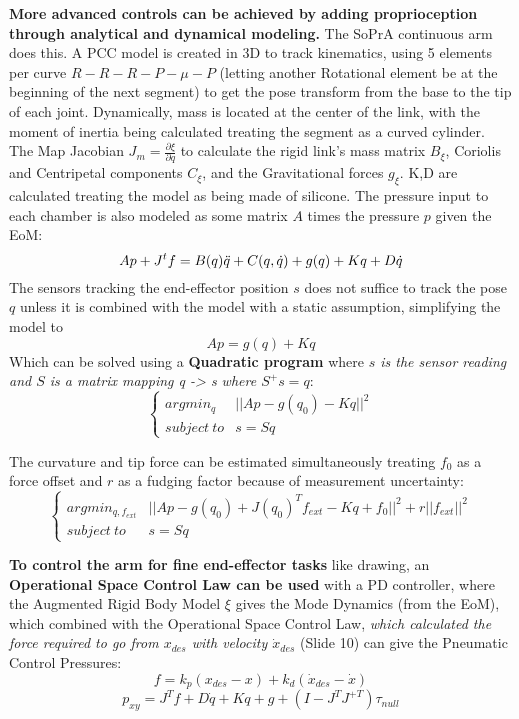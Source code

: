 \documentclass[onecolumn,a4paper]{article}
\begin{document}
\textbf{More advanced controls can be achieved by adding proprioception through analytical and dynamical modeling.} The SoPrA continuous arm does this. A PCC model is created in 3D to track kinematics, using 5 elements per curve $R-R-R-P-\mu-P$ (letting another Rotational element be at the beginning of the next segment) to get the pose transform from the base to the tip of each joint. Dynamically, mass is located at the center of the link, with the moment of inertia being calculated treating the segment as a curved cylinder. The Map Jacobian $J_m=\frac{\partial\xi}{\partial q}$ to calculate the rigid link's mass matrix $B_\xi$, Coriolis and Centripetal components $C_\xi$, and the Gravitational forces $g_\xi$. K,D are calculated treating the model as being made of silicone. The pressure input to each chamber is also modeled as some matrix $A$ times the pressure $p$ given the EoM:
\begin{equation}
    Ap+J^tf=B(q)\Ddot{q}+C(q,\Dot{q})+g(q)+Kq+D\Dot{q}
\end{equation}
The sensors tracking the end-effector position $s$ does not suffice to track the pose $q$ unless it is combined with the model with a static assumption, simplifying the model to 
\begin{equation}
    Ap=g(q)+Kq
\end{equation}
Which can be solved using a \textbf{Quadratic program} where \emph{$s$ is the sensor reading and $S$ is a matrix mapping q -> s where $S^+s=q$}:
\begin{equation}
    \left\{\begin{array}{cc}
        argmin_q & ||Ap-g(q_0)-Kq||^2 \\
        subject\:to & s=Sq
    \end{array}\right.
\end{equation}

The curvature and tip force can be estimated simultaneously treating $f_0$ as a force offset and $r$ as a fudging factor because of measurement uncertainty:
\begin{equation}
    \left\{\begin{array}{cc}
        argmin_{q,f_{ext}} & ||Ap-g(q_0)+J(q_0)^Tf_{ext}-Kq+f_0||^2 + r||f_{ext}||^2 \\
        subject\:to & s=Sq
    \end{array}\right.
\end{equation}

\textbf{To control the arm for fine end-effector tasks} like drawing, an \textbf{Operational Space Control Law can be used} with a PD controller, where the Augmented Rigid Body Model $\xi$ gives the Mode Dynamics (from the EoM), which combined with the Operational Space Control Law, \emph{which calculated the force required to go from $x_{des}$ with velocity $\Dot{x}_{des}$} (Slide 10) can give the Pneumatic Control Pressures:
\begin{equation}
    f=k_p(x_{des}-x)+k_d(\Dot{x}_{des}-\Dot{x})
\end{equation}
\begin{equation}
    p_{xy} = J^Tf + D\Dot{q}+Kq+g+(I-J^TJ^{+T})\tau_{null}
\end{equation}
\end{document}
